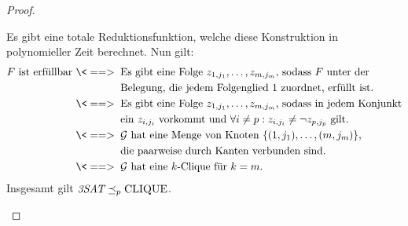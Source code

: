 \begin{proof}
\begin{itemize}
    Es gibt eine totale Reduktionsfunktion, welche diese Konstruktion in polynomieller Zeit berechnet.
    Nun gilt:
    \begin{align*}
    F \text{ ist erfüllbar } \<==> \;\; & \text{Es gibt eine Folge $z_{1,j_1},\dots,z_{m,j_m}$, sodass $F$ unter der}\\
    & \text{Belegung, die jedem Folgenglied $1$ zuordnet, erfüllt ist.}\\
    \<==> \;\;   & \text{Es gibt eine Folge $z_{1,j_1},\dots,z_{m,j_m}$, sodass in jedem Konjunkt}\\
    & \text{ein $z_{i,j_i}$ vorkommt und $\forall i\neq p: z_{i,j_i}\neq \neg z_{p,j_p}$ gilt.}\\
    \<==> \;\;   & \text{$\mathcal{G}$ hat eine Menge von Knoten $\{(1,j_1),\dots,(m,j_m)\}$,}\\
    & \text{die paarweise durch Kanten verbunden sind.}\\
    \<==> \;\;   & \text{$\mathcal{G}$ hat eine $k$-Clique für $k=m$.}
    \end{align*}
    Insgesamt gilt $\textit{3SAT} \preceq_p \operatorname{CLIQUE}$.
    \qedhere
    \end{itemize}
\end{proof}



